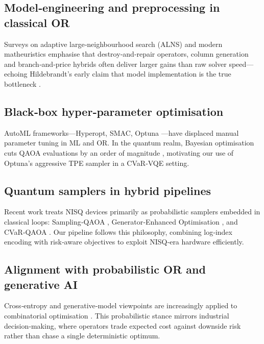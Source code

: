 \subsection{Model‑engineering and preprocessing in classical OR}
Surveys on adaptive large‑neighbourhood search (ALNS)
\cite{windras_mara_survey_2022} and modern matheuristics
\cite{boschetti_contemporary_2024} emphasise that destroy‑and‑repair
operators, column generation and branch‑and‑price hybrids often deliver
larger gains than raw solver speed—echoing Hildebrandt’s early claim
that model implementation is the true bottleneck
\cite{hildebrandt_bottleneck_1981}.

\subsection{Black‑box hyper‑parameter optimisation}
AutoML frameworks—Hyperopt, SMAC, Optuna \cite{akiba_optuna_2019}—have
displaced manual parameter tuning in ML and OR.  In the quantum realm,
Bayesian optimisation cuts QAOA evaluations by an order of magnitude
\cite{tibaldi_bayes_qaoa_2023}, motivating our use of Optuna’s aggressive
TPE sampler in a CVaR‑VQE setting.

\subsection{Quantum samplers in hybrid pipelines}
Recent work treats NISQ devices primarily as probabilistic samplers
embedded in classical loops: Sampling‑QAOA \cite{matsuyama2025},
Generator‑Enhanced Optimisation \cite{albarran2024}, and CVaR‑QAOA
\cite{barkoutsos_improving_2020}.  Our pipeline follows this philosophy,
combining log‑index encoding with risk‑aware objectives to exploit
NISQ‑era hardware efficiently.

\subsection{Alignment with probabilistic OR and generative AI}
Cross‑entropy and generative‑model viewpoints are increasingly applied to
combinatorial optimisation \cite{caramanis_optimizing_2023}.  This probabilistic
stance mirrors industrial decision‑making, where operators trade
expected cost against downside risk rather than chase a single
deterministic optimum.
